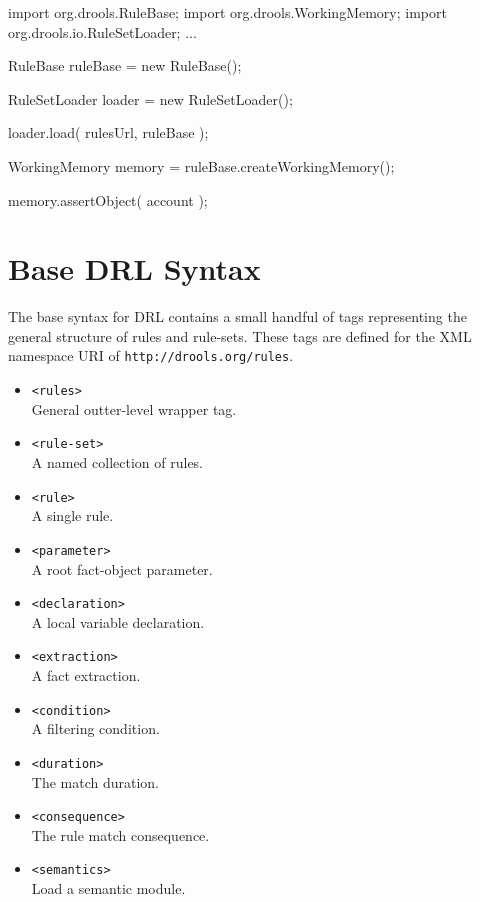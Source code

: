 \begin{codelisting}
import org.drools.RuleBase;
import org.drools.WorkingMemory;
import org.drools.io.RuleSetLoader;
...

    RuleBase ruleBase = new RuleBase();

    RuleSetLoader loader = new RuleSetLoader();

    loader.load( rulesUrl, ruleBase );

    WorkingMemory memory = ruleBase.createWorkingMemory();

    memory.assertObject( account );
\end{codelisting}

\section{Base DRL Syntax}

The base syntax for DRL contains a small handful of tags 
representing the general structure of rules and rule-sets.
These tags are defined for the XML namespace URI of
\verb|http://drools.org/rules|.

\begin{itemize}
	\item \verb|<rules>|\\
		General outter-level wrapper tag.
	\item \verb|<rule-set>|\\
		A named collection of rules.
	\item \verb|<rule>|\\
		A single rule.
	\item \verb|<parameter>|\\
		A root fact-object parameter.
	\item \verb|<declaration>|\\
		A local variable declaration.
	\item \verb|<extraction>|\\
		A fact extraction.
	\item \verb|<condition>|\\
		A filtering condition.
	\item \verb|<duration>|\\
		The match duration.
	\item \verb|<consequence>|\\
		The rule match consequence.
	\item \verb|<semantics>|\\
		Load a semantic module.
\end{itemize}

